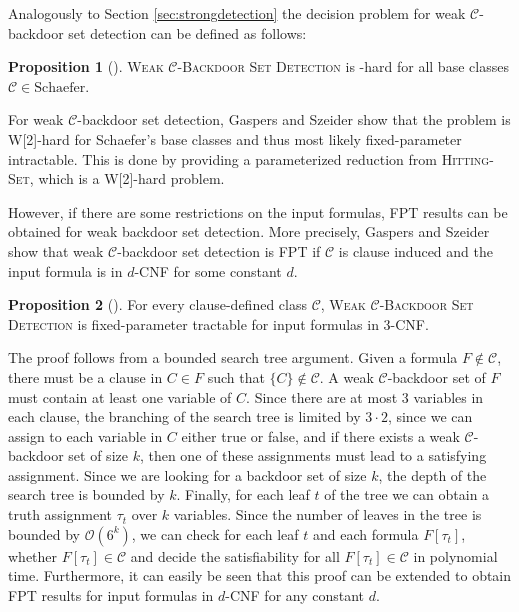 \documentclass[11pt,a4paper]{article}
\makeatletter
\newcommand{\problemtitle}[1]{\gdef\@problemtitle{#1}}%
\newcommand{\probleminput}[1]{\gdef\@probleminput{#1}}%
\newcommand{\problemquestion}[1]{\gdef\@problemquestion{#1}}%
\newcommand{\problemparam}[1]{\gdef\@problemparam{#1}}%
\theoremstyle{definition}
\theoremstyle{proposition}
\newtheorem{proposition}{Proposition}[section]
\makeatother
\begin{document}
Analogously to Section \ref{sec:strongdetection} the decision problem for weak $\mathcal{C}$-backdoor set detection can be defined as follows:
\begin{csproblemparam}
    \problemtitle{Weak $\mathcal{C}$-Backdoor Set Detection}
    \probleminput{A CNF formula $F$ and an integer $k \geq 0$}
    \problemparam{The integer $k$}
    \problemquestion{Does $F$ have a weak $\mathcal{C}$-backdoor set of size at most $k$?}
\end{csproblemparam}
\begin{proposition}[{\cite[Proposition 1, p.293f]{Gaspers2012}}]
\textsc{Weak $\mathcal{C}$-Backdoor Set Detection} is -hard for all base classes $\mathcal{C}\in \text{Schaefer}$.
\end{proposition} 
For weak $\mathcal{C}$-backdoor set detection, Gaspers and Szeider show that the problem is W[2]-hard for Schaefer's base classes and thus most likely fixed-parameter intractable. This is done by providing a parameterized reduction from \textsc{Hitting-Set}, which is a W[2]-hard problem. 

However, if there are some restrictions on the input formulas, FPT results can be obtained for weak backdoor set detection. More precisely, Gaspers and Szeider show that weak $\mathcal{C}$-backdoor set detection is FPT if $\mathcal{C}$ is clause induced and the input formula is in $d$-CNF for some constant $d$. 
\begin{proposition}[{\cite[Proposition 2, p.294f]{Gaspers2012}}]
For every clause-defined class $\mathcal{C}$, \textsc{Weak $\mathcal{C}$-Backdoor Set Detection} is fixed-parameter tractable for input formulas in 3-CNF.
\end{proposition}
The proof follows from a bounded search tree argument. Given a formula $F \notin \mathcal{C}$, there must be a clause in $C \in F$ such that $\{C\} \notin \mathcal{C}$. A weak $\mathcal{C}$-backdoor set of $F$ must contain at least one variable of $C$. Since there are at most 3 variables in each clause, the branching of the search tree is limited by $3 \cdot 2$, since we can assign to each variable in $C$ either true or false, and if there exists a weak $\mathcal{C}$-backdoor set of size $k$, then one of these assignments must lead to a satisfying assignment. Since we are looking for a backdoor set of size $k$, the depth of the search tree is bounded by $k$. Finally, for each leaf $t$ of the tree we can obtain a truth assignment $\tau_t$ over $k$ variables. Since the number of leaves in the tree is bounded by $\mathcal{O}(6^k)$, we can check for each leaf $t$ and each formula $F[\tau_t]$, whether $F[\tau_t] \in \mathcal{C}$ and decide the satisfiability for all $F[\tau_t] \in \mathcal{C}$ in polynomial time. Furthermore, it can easily be seen that this proof can be extended to obtain FPT results for input formulas in $d$-CNF for any constant $d$.  
\end{document}
